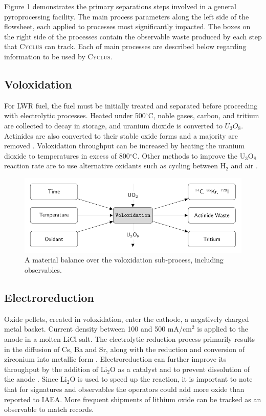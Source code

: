 \documentclass{anstrans}
\newcommand{\Cyclus}{\textsc{Cyclus}\xspace}%
\begin{document}
Figure 1 demonstrates the primary separations steps involved in a general pyroprocessing facility. The main process 
parameters along the left side of the flowsheet, each applied to processes most significantly impacted. The boxes on the 
right side of the processes contain the observable waste produced by each step that \Cyclus can track. Each of main processes 
are described below regarding information to be used by \Cyclus.

\subsection{Voloxidation}

For LWR fuel, the fuel must be initially treated and separated before proceeding with electrolytic processes. Heated under 
500$^{\circ}$C, noble gases, carbon, and tritium are collected to decay in storage, and uranium dioxide is converted to $U_3O_8$. 
Actinides are also converted to their stable oxide forms and a majority are removed \cite{flowsheet_1998,jubin_spent_2009}. 
Voloxidation throughput can be increased by heating the uranium dioxide to temperatures in excess of 800$^{\circ}$C. 
Other methods to improve the U$_3$O$_8$ reaction rate are to use alternative oxidants such as cycling between H$_2$ and air \cite{jubin_spent_2009}.

\begin{figure}[ht]
	\centering
	\includegraphics[width=1\linewidth]{volox}
	\caption{A material balance over the voloxidation sub-process, including observables.}
	\label{fig:volox}
\end{figure}

\subsection{Electroreduction}

Oxide pellets, created in voloxidation, enter the cathode, a negatively charged metal basket. Current density between 100 and 
500 mA/cm$^2$ 
is applied to the anode in a molten LiCl salt. The electrolytic reduction process primarily results in the diffusion of 
Cs, Ba and Sr, along with the reduction and conversion of zirconium into metallic form \cite{choi_electrochemical_2015,flowsheet_1998}.
Electroreduction can further improve its throughput by the addition of Li$_2$O as a catalyst and to prevent dissolution 
of the anode \cite{choi_electrochemical_2015}. Since Li$_2$O is used to speed up the reaction, it is important to note 
that for signatures and observables the operators could add more oxide than reported to IAEA. More frequent shipments 
of lithium oxide can be tracked as an observable to match records.
\end{document}
